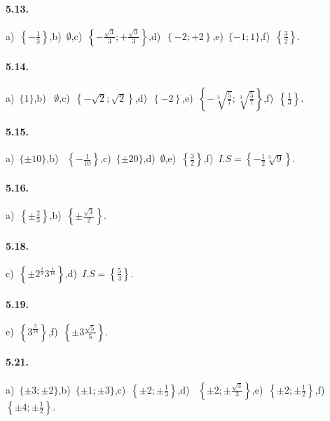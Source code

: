 \paragraph{5.13.} a)~$\left\{-\frac 1 3\right\}$,\quad b)~$\emptyset $,\quad c)~$\left\{-\frac{\sqrt 3} 3;+\frac{\sqrt 3} 3\right\}$,\quad d)~$\left\{-2;+2\right\}$,\quad e)~$\{-1;1\}$,\quad f)~$\left\{\frac 3 2\right\}$.

\paragraph{5.14.} a)~$\{1\}$,\quad b)~ $\emptyset $,\quad c)~$\left\{-\sqrt 2;\sqrt 2\right\}$,\quad d)~$\left\{-2\right\}$,\quad e)~$\left\{-\sqrt[3]{\frac 5 7};\sqrt[3]{\frac 5 7}\right\}$,\quad f)~$\left\{\frac 1 3\right\}$.

\paragraph{5.15.} a)~$\{\pm 10\}$,\quad b)~ $\left\{-\frac 1{10}\right\}$,\quad c)~$\{\pm 20\}$,\quad d)~$\emptyset $,\quad e)~$\left\{\frac 3 2\right\}$,\quad f)~${I.S}=\left\{-\frac 1 2\sqrt[3]9\right\}$.

\paragraph{5.16.} a)~$\left\{\pm \frac 2 3\right\}$,\quad b)~$\left\{\pm \frac{\sqrt 3} 2\right\}$.

\paragraph{5.18.} c)~$\left\{\pm 2^{\frac 1 9}3^{\frac 1{18}}\right\}$,\quad d)~${I.S}=\left\{\frac 5 3\right\}$.

\paragraph{5.19.} e)~$\left\{3^{\frac 5{18}}\right\}$,\quad f)~$\left\{\pm 3\frac{\sqrt 5} 5\right\}$.

\paragraph{5.21.} a)~$\{\pm 3;\pm 2\}$,\quad b)~$\{\pm 1; \pm 3\}$,\quad c)~$\left\{\pm 2;\pm \frac 1 3\right\}$,\quad d)~ $\left\{\pm 2;\pm \frac{\sqrt 3} 3\right\}$,\quad e)~$\left\{\pm 2;\pm \frac 1 2\right\}$,\quad f)~$\left\{\pm 4;\pm \frac 1 2\right\}$.

